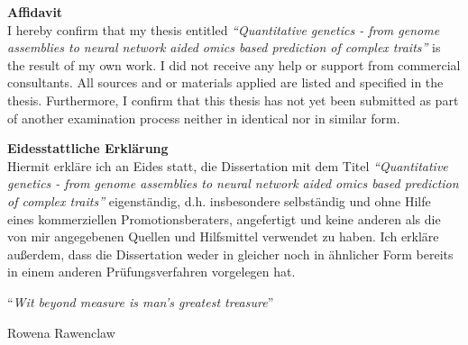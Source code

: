 \documentclass[
12pt, %
english, %
doublespacing, %
headsepline, %
chapterinoneline, %
]{MastersDoctoralThesis} %
\begin{document}

\begin{declaration}
  \noindent
  {\LARGE\textbf{Affidavit}} \\
  \noindent
  I hereby confirm that my thesis entitled \textit{``Quantitative genetics -
  from genome assemblies to neural network aided omics based
  prediction of complex traits''} is the result of my own work. I did not
  receive any help or support from commercial consultants. All sources
  and  or materials applied are listed and specified in the thesis.
  Furthermore, I confirm that this thesis has not yet been submitted
  as part of another examination process neither in identical nor in
  similar form.

  \vspace{0.1\textheight}
  \noindent
  {\LARGE\textbf{Eidesstattliche Erkl\"{a}rung}}\\
  \noindent
  Hiermit erkläre ich an Eides statt, die Dissertation mit dem Titel \textit{``Quantitative genetics -
  from genome assemblies to neural network aided omics based
  prediction of complex traits''} 
  eigenst\"{a}ndig, d.h. insbesondere selbst\"{a}ndig und ohne Hilfe eines
  kommerziellen Promotionsberaters, angefertigt und keine anderen als
  die von mir angegebenen Quellen und Hilfsmittel verwendet zu haben.
  Ich erkl\"{a}re außerdem, dass die Dissertation weder in gleicher noch
  in \"{a}hnlicher Form bereits in einem anderen Pr\"{u}fungsverfahren
  vorgelegen hat.
\end{declaration}
\newpage



\vspace*{0.2\textheight}

\noindent\enquote{\itshape Wit beyond measure is man's greatest treasure}\bigbreak

\hfill Rowena Rawenclaw

\end{document}
